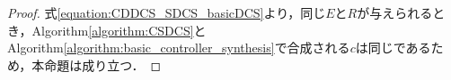 \begin{proof}
    式\ref{equation:CDDCS_SDCS_basicDCS}より，同じ$E$と$R$が与えられるとき，Algorithm\ref{algorithm:CSDCS}とAlgorithm\ref{algorithm:basic_controller_synthesis}で合成される$c$は同じであるため，本命題は成り立つ．
\end{proof}
















